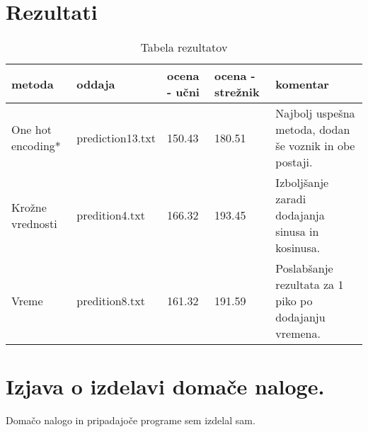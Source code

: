 \documentclass[a4paper,11pt]{article}
\begin{document}
\section{Rezultati}

\begin{table}[htbp]
	\caption{Tabela rezultatov}
	\label{tab1}
	\begin{center}
		\begin{tabular}{llllp{4cm}}
			\hline
				metoda & oddaja & ocena - učni & ocena - strežnik & komentar \\
				\hline
				One hot encoding* & prediction13.txt & 150.43 & 180.51 & Najbolj uspešna metoda, dodan še voznik in obe postaji.\\
				Krožne vrednosti & predition4.txt & 166.32 & 193.45 & Izboljšanje zaradi dodajanja sinusa in kosinusa. \\
				Vreme & predition8.txt & 161.32 & 191.59 & Poslabšanje rezultata za 1 piko po dodajanju vremena. \\
			
		\end{tabular}
	\end{center}
\end{table}

\pagebreak



\section{Izjava o izdelavi domače naloge.}
Domačo nalogo in pripadajoče programe sem izdelal sam.
\end{document}
